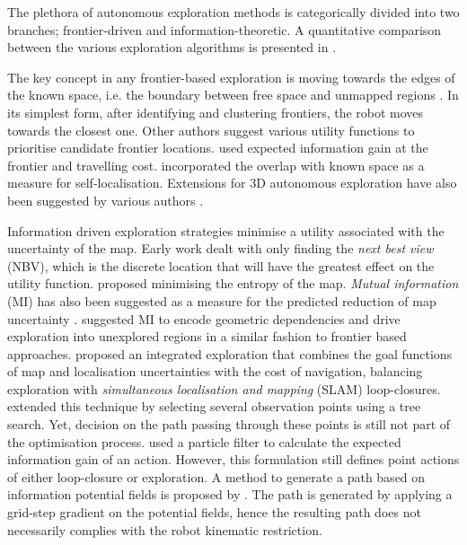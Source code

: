 \documentclass[shortAfour,sageh,times]{sagej_no_sage}
\begin{document}
The plethora of autonomous exploration methods is categorically divided into two branches; frontier-driven and information-theoretic. 
A quantitative comparison between the various exploration algorithms is presented in \citet{Julia2012}.

The key concept in any frontier-based exploration is moving towards the edges of the known space, i.e. the boundary between free space 
and unmapped regions \citep{Yamauchi1997}. In its simplest form, after identifying and clustering frontiers, the robot moves towards 
the closest one. Other authors suggest various utility functions to prioritise candidate frontier locations. \citet{Gonzalez-Banos2002} used expected information gain at the frontier and travelling cost. \citet{Basilico2011} incorporated the overlap with known space as a measure for self-localisation. Extensions for 3D autonomous exploration have also been suggested by various authors \citep{Dornhege2013,Shen2012,Shade2011}.

Information driven exploration strategies minimise a utility associated with the uncertainty of the map. Early work dealt with only finding the \textit{next best view} (NBV), which is the discrete location that will have the greatest effect on the utility function. \citet{Whaite1997} 
proposed minimising the entropy of the map. \textit{Mutual information} (MI) has also been suggested as a measure for the predicted 
reduction of map uncertainty \citep{Elfes1996,Bourgault2002}. \citet{Julian2014} suggested MI to encode geometric dependencies and drive exploration 
into unexplored regions in a similar fashion to frontier based approaches. \citet{Makarenko2002} proposed an integrated 
exploration that combines the goal functions of map and localisation uncertainties with the cost of navigation, balancing exploration with \textit{simultaneous localisation and mapping} (SLAM) loop-closures. \citet{Tovar2006} extended this technique by selecting several observation points using a tree search. Yet, decision on the path passing through these points is still not part of the optimisation process. \citet{Stachniss2005} used a particle filter to calculate the expected information gain of an action. However, this formulation still defines point actions of either loop-closure or exploration. A method to generate a path based on information potential fields is proposed by \citet{Vallve2015}. The path is generated by applying a grid-step gradient on the potential fields, hence the resulting path does not necessarily complies with the robot kinematic restriction.  
\end{document}
